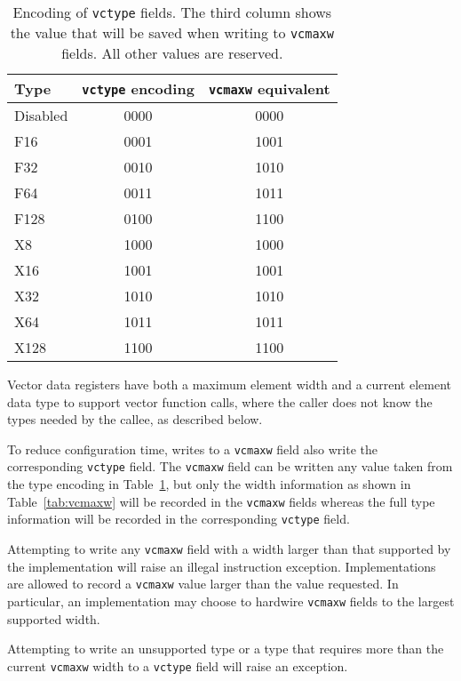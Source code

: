 \begin{table}[hbt]
  \centering
  \begin{tabular}{|l|c|c|}
    \hline
    Type & {\tt vctype} encoding & {\tt vcmaxw} equivalent\\
    \hline
    Disabled & 0000 & 0000 \\
    F16      & 0001 & 1001 \\
    F32      & 0010 & 1010 \\
    F64      & 0011 & 1011 \\
    F128     & 0100 & 1100 \\
    X8       & 1000 & 1000  \\
    X16      & 1001 & 1001  \\
    X32      & 1010 & 1010  \\
    X64      & 1011 & 1011  \\
    X128     & 1100 & 1100  \\
    \hline
  \end{tabular}
  \caption{Encoding of {\tt vctype} fields. The third column shows the
    value that will be saved when writing to {\tt vcmaxw} fields. All
    other values are reserved.}
  \label{tab:vctype}
\end{table}

\begin{commentary}
  Vector data registers have both a maximum element width and a
  current element data type to support vector function calls, where
  the caller does not know the types needed by the callee, as
  described below.
\end{commentary}

To reduce configuration time, writes to a {\tt vcmaxw} field also
write the corresponding {\tt vctype} field.  The {\tt vcmaxw} field
can be written any value taken from the type encoding in
Table~\ref{tab:vctype}, but only the width information as shown in
Table~\ref{tab:vcmaxw} will be recorded in the {\tt vcmaxw} fields
whereas the full type information will be recorded in the
corresponding {\tt vctype} field.

Attempting to write any {\tt vcmaxw} field with a width larger than
that supported by the implementation will raise an illegal instruction
exception.  Implementations are allowed to record a {\tt vcmaxw} value
larger than the value requested.  In particular, an implementation may
choose to hardwire {\tt vcmaxw} fields to the largest supported width.

Attempting to write an unsupported type or a type that requires more
than the current {\tt vcmaxw} width to a {\tt vctype} field will raise
an exception.

